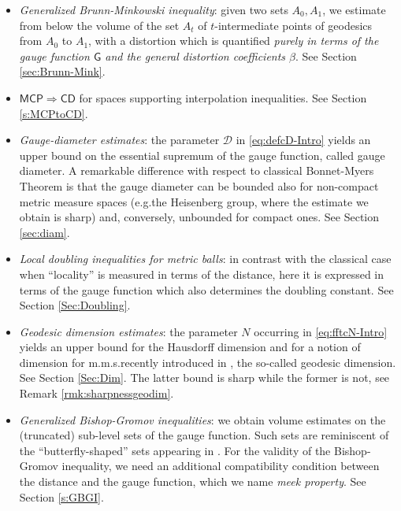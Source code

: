 \documentclass[11pt,a4paper]{article}
\theoremstyle{plain}
\theoremstyle{definition}
\theoremstyle{remark}
\numberwithin{equation}{section}
\newcommand{\CD}{\mathsf{CD}}
\newcommand{\MCP}{\mathsf{MCP}}
\newcommand{\cD}{\mathcal{D}}
\newcommand{\sfG}{\mathsf G}
\begin{document}
\begin{itemize}
\item \emph{Generalized Brunn-Minkowski inequality}: given two sets $A_{0}, A_{1}$, we estimate from below the volume of the set $A_t$ of $t$-intermediate points of geodesics from $A_{0}$ to $A_{1}$,  with a distortion which is quantified \emph{purely in terms of the gauge function $\sfG$ and the general distortion coefficients $\beta$}. See Section \ref{sec:Brunn-Mink}. %
\item \emph{$\MCP \Rightarrow \CD$} for spaces supporting interpolation inequalities. See Section \ref{s:MCPtoCD}.
\item \emph{Gauge-diameter estimates}: the parameter $\cD$ in \eqref{eq:defcD-Intro} yields an upper bound on the essential supremum of the gauge function,  called gauge diameter. A remarkable difference with respect to classical Bonnet-Myers Theorem is that the gauge diameter can be bounded also for non-compact metric measure spaces (e.g.\@ the Heisenberg group, where the estimate we obtain is sharp) and, conversely, unbounded for compact ones. See Section \ref{sec:diam}.
\item \emph{Local doubling inequalities for metric balls}: in contrast with the classical case when ``locality'' is measured in terms of the distance, here it is expressed in terms of the gauge function which also determines the doubling constant. See Section \ref{Sec:Doubling}.
\item \emph{Geodesic dimension estimates}:  the parameter $N$ occurring in \eqref{eq:fftcN-Intro} yields an upper bound for the Hausdorff dimension and for a  notion of dimension for m.m.s.\@ recently introduced in \cite{ABR-curvature, R-MCP}, the so-called geodesic dimension. See Section \ref{Sec:Dim}. The latter bound is sharp while the former is not, see Remark \ref{rmk:sharpnessgeodim}.  
\item \emph{Generalized Bishop-Gromov inequalities}: we obtain volume estimates on the (truncated)  sub-level sets of the gauge function. Such sets are reminiscent of the ``butterfly-shaped'' sets appearing in \cite[Fig.\@ 2]{NJ09}. For the validity of the Bishop-Gromov inequality, we need an additional compatibility condition between the distance and the gauge function, which we name \emph{meek property}. See Section \ref{s:GBGI}.
\end{itemize}
\end{document}
